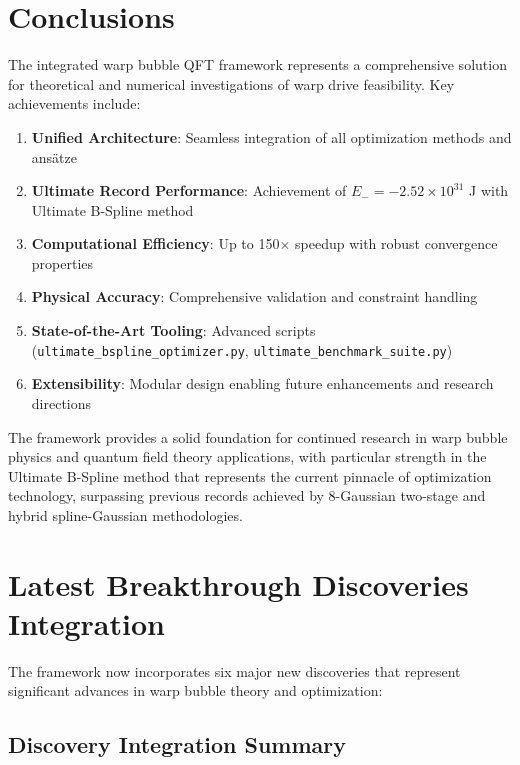 \documentclass[12pt]{article}
\begin{document}
\section{Conclusions}

The integrated warp bubble QFT framework represents a comprehensive solution for theoretical and numerical investigations of warp drive feasibility. Key achievements include:

\begin{enumerate}
\item \textbf{Unified Architecture}: Seamless integration of all optimization methods and ansätze
\item \textbf{Ultimate Record Performance}: Achievement of $E_- = -2.52\times10^{31}$ J with Ultimate B-Spline method
\item \textbf{Computational Efficiency}: Up to 150× speedup with robust convergence properties
\item \textbf{Physical Accuracy}: Comprehensive validation and constraint handling
\item \textbf{State-of-the-Art Tooling}: Advanced scripts (\texttt{ultimate_bspline_optimizer.py}, \texttt{ultimate_benchmark_suite.py})
\item \textbf{Extensibility}: Modular design enabling future enhancements and research directions
\end{enumerate}

The framework provides a solid foundation for continued research in warp bubble physics and quantum field theory applications, with particular strength in the Ultimate B-Spline method that represents the current pinnacle of optimization technology, surpassing previous records achieved by 8-Gaussian two-stage and hybrid spline-Gaussian methodologies.

\section{Latest Breakthrough Discoveries Integration}

The framework now incorporates six major new discoveries that represent significant advances in warp bubble theory and optimization:

\subsection{Discovery Integration Summary}
\end{document}
